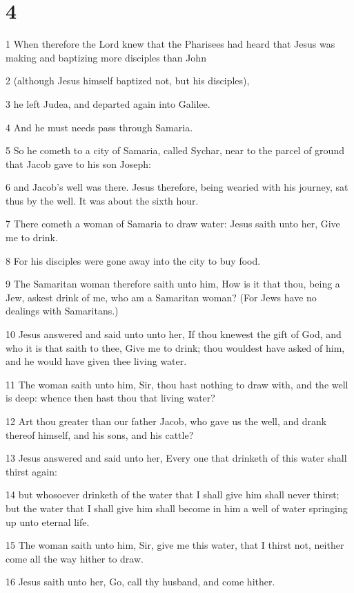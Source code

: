 \chapter{4}

\par 1 When therefore the Lord knew that the Pharisees had heard that Jesus was making and baptizing more disciples than John
\par 2 (although Jesus himself baptized not, but his disciples),
\par 3 he left Judea, and departed again into Galilee.
\par 4 And he must needs pass through Samaria.
\par 5 So he cometh to a city of Samaria, called Sychar, near to the parcel of ground that Jacob gave to his son Joseph:
\par 6 and Jacob's well was there. Jesus therefore, being wearied with his journey, sat thus by the well. It was about the sixth hour.
\par 7 There cometh a woman of Samaria to draw water: Jesus saith unto her, Give me to drink.
\par 8 For his disciples were gone away into the city to buy food.
\par 9 The Samaritan woman therefore saith unto him, How is it that thou, being a Jew, askest drink of me, who am a Samaritan woman? (For Jews have no dealings with Samaritans.)
\par 10 Jesus answered and said unto unto her, If thou knewest the gift of God, and who it is that saith to thee, Give me to drink; thou wouldest have asked of him, and he would have given thee living water.
\par 11 The woman saith unto him, Sir, thou hast nothing to draw with, and the well is deep: whence then hast thou that living water?
\par 12 Art thou greater than our father Jacob, who gave us the well, and drank thereof himself, and his sons, and his cattle?
\par 13 Jesus answered and said unto her, Every one that drinketh of this water shall thirst again:
\par 14 but whosoever drinketh of the water that I shall give him shall never thirst; but the water that I shall give him shall become in him a well of water springing up unto eternal life.
\par 15 The woman saith unto him, Sir, give me this water, that I thirst not, neither come all the way hither to draw.
\par 16 Jesus saith unto her, Go, call thy husband, and come hither.
